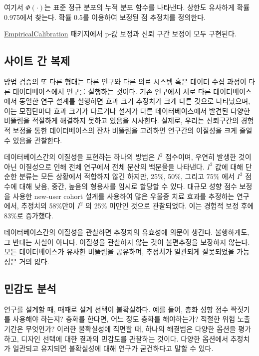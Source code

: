 \documentclass[11pt]{book}
\theoremstyle{definition}
\theoremstyle{definition}
\theoremstyle{definition}
\theoremstyle{remark}
\let\BeginKnitrBlock\begin \let\EndKnitrBlock\end
\begin{document}
여기서 \(\Phi(\cdot)\)는 표준 정규 분포의 누적 분포 함수를 나타낸다.
상한도 유사하게 확률 0.975에서 찾는다. 확률 0.5를 이용하여 보정된 점
추정치를 정의한다.

\href{https://ohdsi.github.io/EmpiricalCalibration/}{EmpiricalCalibration}
패키지에서 p-값 보정과 신뢰 구간 보정이 모두 구현된다.

\subsection{사이트 간 복제}\label{--}


방법 검증의 또 다른 형태는 다른 인구와 다른 의료 시스템 혹은 데이터 수집
과정이 다른 데이터베이스에서 연구를 실행하는 것이다. 기존 연구에서 서로
다른 데이터베이스에서 동일한 연구 설계를 실행하면 효과 크기 추정치가
크게 다른 것으로 나타났으며, \citep{madigan_2013} 이는 모집단마다 효과
크기가 다르거나 설계가 다른 데이터베이스에서 발견된 다양한 비뚤림을
적절하게 해결하지 못하고 있음을 시사한다. 실제로, 우리는 신뢰구간의
경험적 보정을 통한 데이터베이스의 잔차 비뚤림을 고려하면 연구간의
이질성을 크게 줄일 수 있음을 관찰한다. \citep{schuemie_2018}

데이터베이스간의 이질성을 표현하는 하나의 방법은 \(I^2\) 점수이며,
우연히 발생한 것이 아닌 이질성으로 인해 전체 연구에서 전체 분산의
백분율을 나타낸다. \citep{higgins_2003} \(I^2\) 값에 대해 단순한 분류는
모든 상황에서 적합하지 않긴 하지만, 25\%, 50\%, 그리고 75\% 에서 \(I^2\)
점수에 대해 낮음, 중간, 높음의 형용사를 임시로 할당할 수 있다. 대규모
성향 점수 보정을 사용한 new-user cohort 설계를 사용하여 많은 우울증 치료
효과를 추정하는 연구에서, \citep{schuemie_2018b} 추정치의 58\%만이
\(I^2\) 의 25\% 미만인 것으로 관찰되었다. 이는 경험적 보정 후에 83\%로
증가했다.

\BeginKnitrBlock{rmdimportant}
데이터베이스간의 이질성을 관찰하면 추정치의 유효성에 의문이 생긴다.
불행하게도, 그 반대는 사실이 아니다. 이질성을 관찰하지 않는 것이
불편추정을 보장하지 않는다. 모든 데이터베이스가 유사한 비뚤림을
공유하며, 추정치가 일관되게 잘못되었을 가능성은 거의 없다.
\EndKnitrBlock{rmdimportant}

\subsection{민감도 분석}\label{-}


연구를 설계할 때, 때때로 설계 선택이 불확실하다. 예를 들어, 층화 성향
점수 짝짓기를 사용해야 하는지? 층화를 한다면, 어느 정도 층화를
해야하는가? 적절한 위험 노출 기간은 무엇인가? 이러한 불확실성에 직면할
때, 하나의 해결법은 다양한 옵션을 평가하고, 디자인 선택에 대한 결과의
민감도를 관찰하는 것이다. 다양한 옵션에서 추정치가 일관되고 유지되면
불확실성에 대해 연구가 굳건하다고 말할 수 있다.
\end{document}
